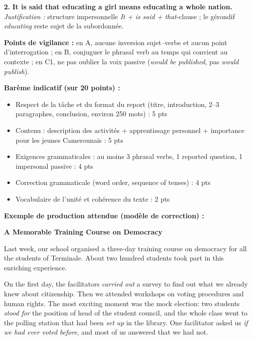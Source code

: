 \documentclass[11pt]{article}
\begin{document}
\begin{corrige}
\textbf{2.} \textbf{It is said that educating a girl means educating a whole nation.}\\
\emph{Justification :} structure impersonnelle \emph{It + is said + that}-clause ; le gérondif \emph{educating} reste sujet de la subordonnée.

\textbf{Points de vigilance :} en A, aucune inversion sujet--verbe et aucun point d'interrogation ; en B, conjuguer le phrasal verb au temps qui convient au contexte ; en C1, ne pas oublier la voix passive (\emph{would be published}, pas \emph{would publish}).
\end{corrige}

\begin{corrige}

\textbf{Barème indicatif (sur 20 points) :}
\begin{itemize}
\item Respect de la tâche et du format du report (titre, introduction, 2--3 paragraphes, conclusion, environ 250 mots) : 5 pts
\item Contenu : description des activités + apprentissage personnel + importance pour les jeunes Camerounais : 5 pts
\item Exigences grammaticales : au moins 3 phrasal verbs, 1 reported question, 1 impersonal passive : 4 pts
\item Correction grammaticale (word order, sequence of tenses) : 4 pts
\item Vocabulaire de l'unité et cohérence du texte : 2 pts
\end{itemize}

\textbf{Exemple de production attendue (modèle de correction) :}

\textbf{A Memorable Training Course on Democracy}

Last week, our school organised a three-day training course on democracy for all the students of Terminale. About two hundred students took part in this enriching experience.

On the first day, the facilitators \emph{carried out} a survey to find out what we already knew about citizenship. Then we attended workshops on voting procedures and human rights. The most exciting moment was the mock election: two students \emph{stood for} the position of head of the student council, and the whole class went to the polling station that had been \emph{set up} in the library. One facilitator asked us \emph{if we had ever voted before}, and most of us answered that we had not.


\end{corrige}
\end{document}
